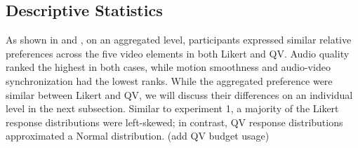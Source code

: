 \subsection{Descriptive Statistics}

As shown in  and , on an aggregated level, participants expressed similar relative preferences across the five video elements in both Likert and QV. Audio quality ranked the highest in both cases, while motion smoothness and audio-video synchronization had the lowest ranks. While the aggregated preference were similar between Likert and QV, we will discuss their differences on an individual level in the next subsection. Similar to experiment 1, a majority of the Likert response distributions were left-skewed; in contrast, QV response distributions approximated a Normal distribution. (add QV budget usage)

